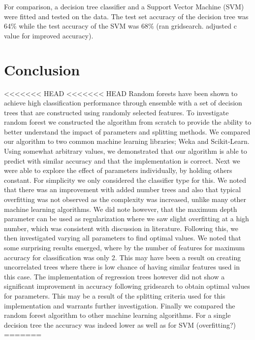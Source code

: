 \documentclass{article} %
\begin{document}
For comparison, a decision tree classifier and a Support Vector Machine (SVM) were fitted and tested on the data. The test set accuracy of the decision tree was 64\% while the test accuracy of the SVM was 68\% (ran gridsearch. adjusted c value for improved accuracy).

\section{Conclusion}

<<<<<<< HEAD
<<<<<<< HEAD
Random forests have been shown to achieve high classification performance through ensemble with a set of decision trees that are constructed using randomly selected features. To investigate random forest we constructed the algorithm from scratch to provide the ability to better understand the impact of parameters and splitting methods. We compared our algorithm to two common machine learning libraries; Weka and Scikit-Learn. Using somewhat arbitrary values, we demonstrated that our algorithm is able to predict with similar accuracy and that the implementation is correct. Next we were able to explore the effect of parameters individually, by holding others constant. For simplicity we only considered the classifier type for this. We noted that there was an improvement with added number trees and also that typical overfitting was not observed as the complexity was increased, unlike many other machine learning algorithms. We did note however, that the maximum depth parameter can be used as regularization where we saw slight overfitting at a high number, which was consistent with discussion in literature. Following this, we then investigated varying all parameters to find optimal values. We noted that some surprising results emerged, where by the number of features for maximum accuracy for classification was only 2. This may have been a result on creating uncorrelated trees where there is low chance of having similar features used in this case. The implementation of regression trees however did not show a significant improvement in accuracy following gridsearch to obtain optimal values for parameters. This may be a result of the splitting criteria used for this implementation and warrants further investigation. Finally we compared the random forest algorithm to other machine learning algorithms. For a single decision tree the accuracy was indeed lower as well as for SVM (overfitting?)
=======
\end{document}

